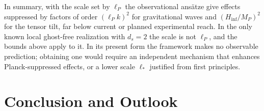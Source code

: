 \documentclass[11pt,a4paper,reqno]{amsart}
\theoremstyle{definition}
\numberwithin{equation}{section}
\begin{document}
In summary, with the scale set by $\ell_P$ the observational ans\"atze give effects suppressed by factors of order $(\ell_P k)^2$ for gravitational waves and $(H_{\mathrm{inf}}/M_P)^2$ for the tensor tilt, far below current or planned experimental reach. In the only known local ghost-free realization with $d_s = 2$ the scale is not $\ell_P$, and the bounds above apply to it. In its present form the framework makes no observable prediction; obtaining one would require an independent mechanism that enhances Planck-suppressed effects, or a lower scale $\ell_\ast$ justified from first principles.

\section{Conclusion and Outlook}
\label{sec:conclusion}
\end{document}
